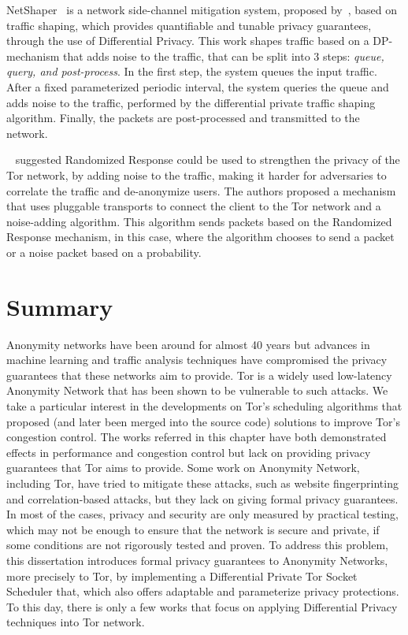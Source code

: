 NetShaper~\cite{NetShaper} is a network side-channel mitigation system, proposed by~\citeauthor{NetShaper}, based on traffic shaping, which provides quantifiable and tunable privacy guarantees, through the use of Differential Privacy. This work shapes traffic based on a DP-mechanism that adds noise to the traffic, that can be split into 3 steps: \textit{queue, query, and post-process}. In the first step, the system queues the input traffic. After a fixed parameterized periodic interval, the system queries the queue and adds noise to the traffic, performed by the differential private traffic shaping algorithm. Finally, the packets are post-processed and transmitted to the network. 

\citeauthor{VilalongaINForum}~\cite{VilalongaINForum} suggested Randomized Response could be used to strengthen the privacy of the Tor network, by adding noise to the traffic, making it harder for adversaries to correlate the traffic and de-anonymize users. The authors proposed a mechanism that uses pluggable transports to connect the client to the Tor network and a noise-adding algorithm. This algorithm sends packets based on the Randomized Response mechanism, in this case, where the algorithm chooses to send a packet or a noise packet based on a probability.

\section{Summary}\label{sec:related_work_summary}

Anonymity networks have been around for almost 40 years but advances in machine learning and traffic analysis techniques have compromised the privacy guarantees that these networks aim to provide. Tor is a widely used low-latency Anonymity Network that has been shown to be vulnerable to such attacks. We take a particular interest in the developments on Tor's scheduling algorithms that proposed (and later been merged into the source code) solutions to improve Tor's congestion control. The works referred in this chapter have both demonstrated effects in performance and congestion control but lack on providing privacy guarantees that Tor aims to provide. Some work on Anonymity Network, including Tor, have tried to mitigate these attacks, such as website fingerprinting and correlation-based attacks, but they lack on giving formal privacy guarantees. In most of the cases, privacy and security are only measured by practical testing, which may not be enough to ensure that the network is secure and private, if some conditions are not rigorously tested and proven. To address this problem, this dissertation introduces formal privacy guarantees to Anonymity Networks, more precisely to Tor, by implementing a Differential Private Tor Socket Scheduler that, which also offers adaptable and parameterize privacy protections. To this day, there is only a few works that focus on applying Differential Privacy techniques into Tor network. 